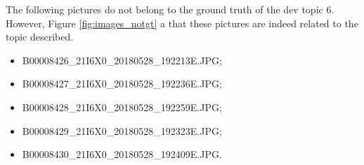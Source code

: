         The following pictures do not belong to the ground truth of the dev topic 6. However, Figure \ref{fig:images_notgt} a that these pictures are indeed related to the topic described.

        \begin{itemize}
            \centering
            \item B00008426\_21I6X0\_20180528\_192213E.JPG;
            \item B00008427\_21I6X0\_20180528\_192236E.JPG;
            \item B00008428\_21I6X0\_20180528\_192259E.JPG;
            \item B00008429\_21I6X0\_20180528\_192323E.JPG;
            \item B00008430\_21I6X0\_20180528\_192409E.JPG.
        \end{itemize}
       
